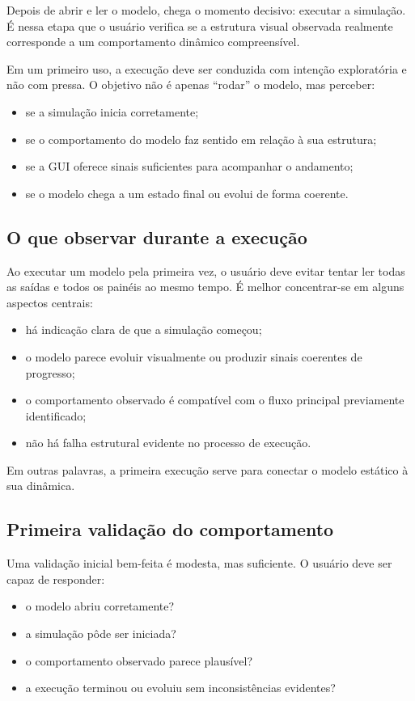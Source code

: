 Depois de abrir e ler o modelo, chega o momento decisivo: executar a simulação. É nessa etapa que o usuário verifica se a estrutura visual observada realmente corresponde a um comportamento dinâmico compreensível.

Em um primeiro uso, a execução deve ser conduzida com intenção exploratória e não com pressa. O objetivo não é apenas ``rodar'' o modelo, mas perceber:
\begin{itemize}
    \item se a simulação inicia corretamente;
    \item se o comportamento do modelo faz sentido em relação à sua estrutura;
    \item se a GUI oferece sinais suficientes para acompanhar o andamento;
    \item se o modelo chega a um estado final ou evolui de forma coerente.
\end{itemize}

\subsection{O que observar durante a execução}
\label{subsec:cap4_o_que_observar_durante_execucao}

Ao executar um modelo pela primeira vez, o usuário deve evitar tentar ler todas as saídas e todos os painéis ao mesmo tempo. É melhor concentrar-se em alguns aspectos centrais:

\begin{itemize}
    \item há indicação clara de que a simulação começou;
    \item o modelo parece evoluir visualmente ou produzir sinais coerentes de progresso;
    \item o comportamento observado é compatível com o fluxo principal previamente identificado;
    \item não há falha estrutural evidente no processo de execução.
\end{itemize}

Em outras palavras, a primeira execução serve para conectar o modelo estático à sua dinâmica.

\subsection{Primeira validação do comportamento}
\label{subsec:cap4_primeira_validacao}

Uma validação inicial bem-feita é modesta, mas suficiente. O usuário deve ser capaz de responder:
\begin{itemize}
    \item o modelo abriu corretamente?
    \item a simulação pôde ser iniciada?
    \item o comportamento observado parece plausível?
    \item a execução terminou ou evoluiu sem inconsistências evidentes?
\end{itemize}

